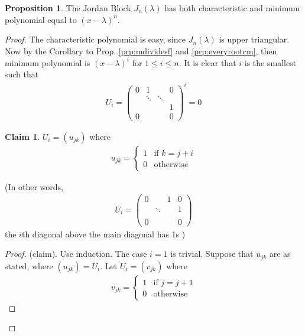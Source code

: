 \documentclass{article}
\theoremstyle{definition} \newtheorem*{definition}{Definition}
\newtheorem{proposition}[theorem]{Proposition}
\newtheorem*{claim}{Claim}
\begin{document}
\begin{proposition}
  The Jordan Block $J_n(\lambda)$ has both characteristic and minimum
  polynomial equal to $(x-\lambda)^n$.
\end{proposition}

\begin{proof}
  The characteristic polynomial is easy, since $J_n(\lambda)$ is upper
  triangular. Now by the Corollary to Prop. \ref{prp:mdividesf} and
  \ref{prp:everyrootcm}, then minimum polynomial is $(x-\lambda)^i$
  for $1 \le i \le n$. It is clear that $i$ is the smallest such that
  \begin{align*}
    U_i = \left( 
    \begin{matrix}
      0 & 1 & & 0\\
      & \ddots & \ddots &\\
      & & & 1\\
      0 & & & 0
    \end{matrix}
    \right)^i = 0
  \end{align*}

  \begin{claim}
    $U_i = \left( u_{jk} \right)$ where
    \begin{align*}
      u_{jk}=
      \begin{cases}
        1 & \text{if } k=j+i\\
        0 & \text{otherwise}
      \end{cases}
    \end{align*}

    (In other words, 
    \begin{align*}
      U_i = \left( 
      \begin{matrix}
        0 & & 1 & 0\\
        & \ddots & & 1\\
        & & &\\
        0 & & & 0
      \end{matrix}
      \right)
    \end{align*}
    the $i$th diagonal above the main diagonal has 1s
    )
  \end{claim}

  \begin{proof}
    (claim). Use induction. The case $i=1$ is trivial. Suppose that
    $u_{jk}$ are as stated, where $(u_{jk})=U_i$. Let 
    $U_i=\left( v_{jk} \right)$ where
    \begin{align*}
      v_{jk} = 
      \begin{cases}
        1 & \text{if } j = j+1\\
        0 & \text{otherwise}
      \end{cases}
    \end{align*}


\end{proof}
\end{proof}
\end{document}
